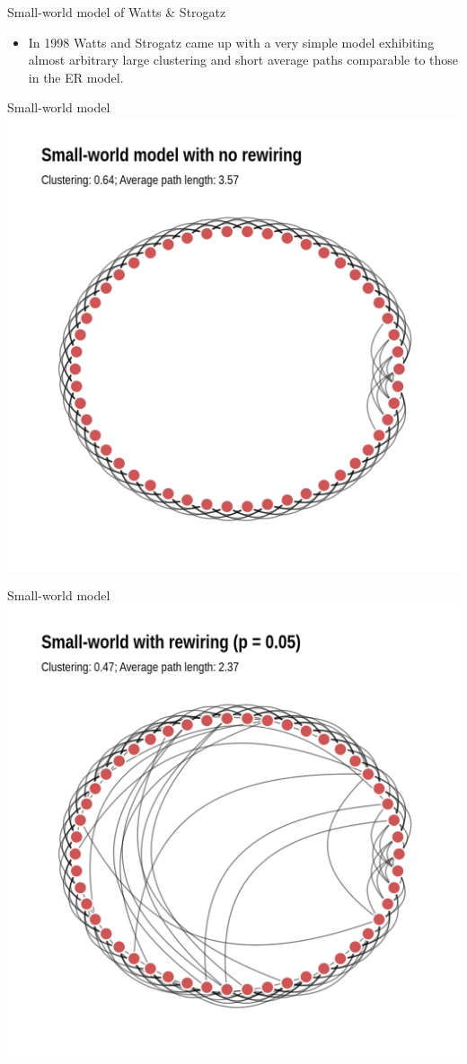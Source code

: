 \documentclass[
    hyperref={colorlinks,linkcolor=blue,urlcolor=blue,citecolor=blue}
]{beamer}
\begin{document}
\begin{frame}{Small-world model of Watts \& Strogatz}
\begin{itemize}
    \item In 1998 Watts and Strogatz came up with a very simple model
    exhibiting almost arbitrary large clustering and short average paths
    comparable to those in the ER model.
\end{itemize}
\end{frame}

\begin{frame}{Small-world model}
\centering
\includegraphics[width=.7\textwidth]{structure/small_world_no_rewiring-1}
\end{frame}

\begin{frame}{Small-world model}
\centering
\includegraphics[width=.7\textwidth]{structure/small_world_with_rewiring-1}
\end{frame}
\end{document}
